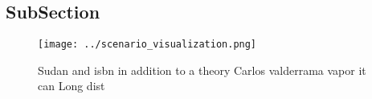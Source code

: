 \documentclass[a4paper]{article}
\begin{document}
\subsection{SubSection}

\begin{figure}
\centering
\texttt{[image: ../scenario\_visualization.png]}
\caption{Sudan and isbn in addition to a theory Carlos valderrama vapor it can Long dist
}
\end{figure}
 
\end{document}
